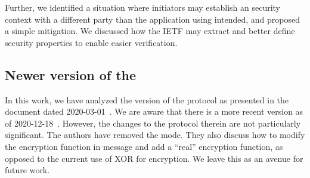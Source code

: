 \documentclass[runningheads, envcountsame, hidelinks, a4paper, draft, x11names]{llncs}
\begin{document}
Further, we identified a situation where initiators may establish an \mOscore{}
security context with a different party than the application using \mEdhoc{}
intended, and proposed a simple mitigation.
%
We discussed how the IETF may extract and better define security properties to
enable easier verification.

\subsection{Newer version of the \mSpec} \label{sec:newdrafts}
In this work, we have analyzed the version of the \mEdhoc{} protocol as
presented in the \mSpec{} document dated 2020-03-01~\cite{our-analysis-selander-lake-edhoc-01}.
We are aware that there is a more recent version as of 2020-12-18~\cite{latest-ietf-lake-edhoc-03}. 
However, the changes to the protocol therein are not particularly significant. 
The authors have removed the \mPskPsk{} mode. They also discuss how to modify the encryption function in message  \mMsgtwo{} and add a ``real'' encryption function, as opposed to the current use of XOR for encryption. 
We leave this as an avenue for future work. 


%
%


%
%




\end{document}
